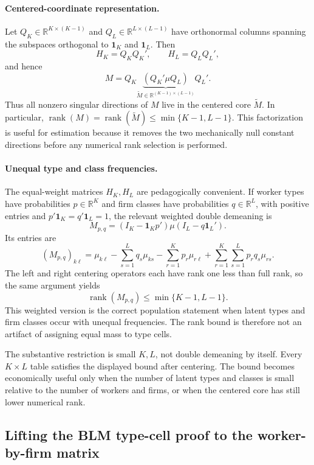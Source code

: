 \documentclass[11pt]{article}
\newcommand{\R}{\mathbb{R}}
\newcommand{\rank}{\operatorname{rank}}
\newcommand{\one}{\mathbf{1}}
\begin{document}
\paragraph{Centered-coordinate representation.}
Let \(Q_K\in\R^{K\times(K-1)}\) and
\(Q_L\in\R^{L\times(L-1)}\) have orthonormal columns spanning the subspaces
orthogonal to \(\one_K\) and \(\one_L\).  Then
\[
H_K=Q_KQ_K',
\qquad
H_L=Q_LQ_L',
\]
and hence
\[
M
=
Q_K\underbrace{(Q_K'\mu Q_L)}_{\widetilde M\in
\R^{(K-1)\times(L-1)}}Q_L'.
\tag{BLM-centered-core}
\]
Thus all nonzero singular directions of \(M\) live in the centered core
\(\widetilde M\).  In particular,
\(\rank(M)=\rank(\widetilde M)\leq\min\{K-1,L-1\}\).  This factorization is
useful for estimation because it removes the two mechanically null constant
directions before any numerical rank selection is performed.

\paragraph{Unequal type and class frequencies.}
The equal-weight matrices \(H_K,H_L\) are pedagogically convenient.  If worker
types have probabilities \(p\in\R^K\) and firm classes have probabilities
\(q\in\R^L\), with positive entries and \(p'\one_K=q'\one_L=1\), the relevant
weighted double demeaning is
\[
M_{p,q}
=
(I_K-\one_Kp')\mu(I_L-q\one_L').
\tag{weighted-DD}
\]
Its entries are
\[
(M_{p,q})_{k\ell}
=
\mu_{k\ell}
-\sum_{s=1}^L q_s\mu_{ks}
-\sum_{r=1}^K p_r\mu_{r\ell}
+\sum_{r=1}^K\sum_{s=1}^L p_rq_s\mu_{rs}.
\]
The left and right centering operators each have rank one less than full rank,
so the same argument yields
\[
\boxed{\rank(M_{p,q})\leq\min\{K-1,L-1\}.}
\]
This weighted version is the correct population statement when latent types and
firm classes occur with unequal frequencies.  The rank bound is therefore not
an artifact of assigning equal mass to type cells.

The substantive restriction is small \(K,L\), not double demeaning by itself.
Every \(K\times L\) table satisfies the displayed bound after centering.  The
bound becomes economically useful only when the number of latent types and
classes is small relative to the number of workers and firms, or when the
centered core has still lower numerical rank.

\subsection{Lifting the BLM type-cell proof to the worker-by-firm matrix}
\end{document}

